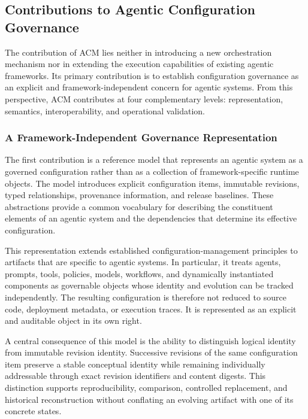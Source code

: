 \documentclass[10pt]{article}
\begin{document}
\subsection{Contributions to Agentic Configuration Governance}
\label{sec:governance_contributions}

The contribution of ACM lies neither in introducing a new orchestration mechanism nor in extending the execution capabilities of existing agentic frameworks. Its primary contribution is to establish configuration governance as an explicit and framework-independent concern for agentic systems. From this perspective, ACM contributes at four complementary levels: representation, semantics, interoperability, and operational validation.

\subsubsection{A Framework-Independent Governance Representation}

The first contribution is a reference model that represents an agentic system as a governed configuration rather than as a collection of framework-specific runtime objects. The model introduces explicit configuration items, immutable revisions, typed relationships, provenance information, and release baselines. These abstractions provide a common vocabulary for describing the constituent elements of an agentic system and the dependencies that determine its effective configuration.

This representation extends established configuration-management principles to artifacts that are specific to agentic systems. In particular, it treats agents, prompts, tools, policies, models, workflows, and dynamically instantiated components as governable objects whose identity and evolution can be tracked independently. The resulting configuration is therefore not reduced to source code, deployment metadata, or execution traces. It is represented as an explicit and auditable object in its own right.

A central consequence of this model is the ability to distinguish logical identity from immutable revision identity. Successive revisions of the same configuration item preserve a stable conceptual identity while remaining individually addressable through exact revision identifiers and content digests. This distinction supports reproducibility, comparison, controlled replacement, and historical reconstruction without conflating an evolving artifact with one of its concrete states.
\end{document}
